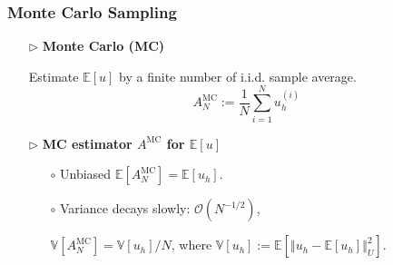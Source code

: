 \documentclass{beamer}
\begin{document}
\begin{frame}[t]
\frametitle{Monte Carlo Sampling}

\begin{itemize}[leftmargin=5pt] 
    \item[$\triangleright$] \textcolor{myblue3}{\bf Monte Carlo (MC)}
    
    {\footnotesize 
    Estimate $\mathbb{E}[u]$ by  a finite number of i.i.d. sample average.
        \[
    A^{\text{MC}}_N:= \frac {1}{N}\sum_{i=1}^N u_h^{(i)}
    \]
     }       
    \item[$\triangleright$] \textcolor{myblue3}{\bf MC estimator $A^{\text{MC}}$ for $\mathbb{E}[u]$}
    {\footnotesize 
    \begin{itemize}[leftmargin=15pt] 
    \item[$\circ$] Unbiased $\mathbb{E}[A^{\text{MC}}_N] = \mathbb{E}[u_h]$.
    \item[$\circ$] Variance decays slowly: $\mathcal{O}(N^{-1/2})$,
    
    $\mathbb{V}[A^{\text{MC}}_N]= \mathbb{V}[u_h]/N$, where $\mathbb{V}[u_h] := \mathbb{E}[\left\Vert u_h - \mathbb{E}[u_h]\right\Vert_U^2]$.
    \end{itemize}
    }
    
    
    
            
\end{itemize}

\end{frame}
\end{document}
